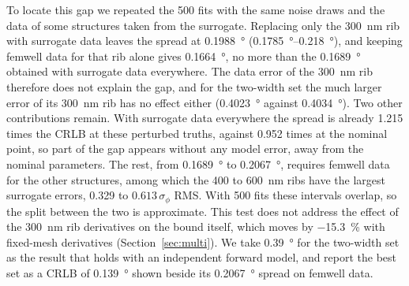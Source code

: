 To locate this gap we repeated the 500 fits with the same noise draws and the data of some structures taken from the surrogate.
Replacing only the \qty{300}{nm} rib with surrogate data leaves the spread at \qty{0.1988}{\degree}
(\qtyrange{0.1785}{0.218}{\degree}), and keeping femwell data for that rib alone gives \qty{0.1664}{\degree}, no more than the
\qty{0.1689}{\degree} obtained with surrogate data everywhere. The data error of the \qty{300}{nm} rib therefore does not explain the gap, and for the two-width set
the much larger error of its \qty{300}{nm} rib has no effect either (\qty{0.4023}{\degree} against \qty{0.4034}{\degree}). Two other contributions remain. With surrogate data
everywhere the spread is already 1.215 times the CRLB at these perturbed truths, against 0.952 times at the nominal point, so part of the gap appears without any
model error, away from the nominal parameters. The rest, from \qty{0.1689}{\degree} to \qty{0.2067}{\degree}, requires femwell data for the other structures, among which
the 400 to \qty{600}{nm} ribs have the largest surrogate errors, 0.329 to $0.613\,\sigma_\phi$ RMS. With 500 fits these intervals overlap, so the split between the two is approximate.
This test does not address the effect of the \qty{300}{nm} rib derivatives on the bound itself, which moves by \qty{-15.3}{\percent} with fixed-mesh
derivatives (Section~\ref{sec:multi}). We take \qty{0.39}{\degree} for the two-width set as the result that holds with an independent forward model, and
report the best set as a CRLB of \qty{0.139}{\degree} shown beside its \qty{0.2067}{\degree} spread on femwell data.

